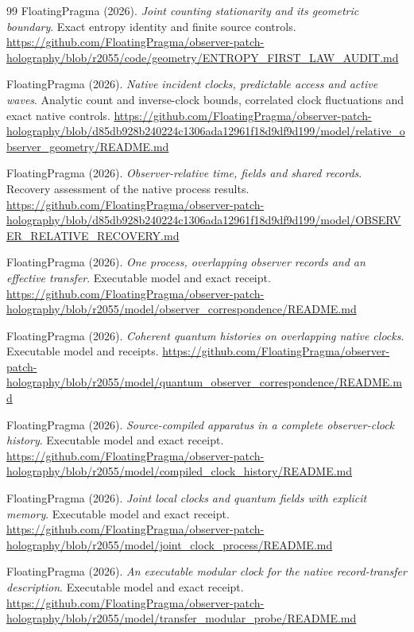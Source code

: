 \documentclass[11pt]{article}
\theoremstyle{definition}
\theoremstyle{remark}
\theoremstyle{plain}
\begin{document}
{\begin{thebibliography}{99}
FloatingPragma (2026). \emph{Joint counting stationarity and its geometric
boundary}. Exact entropy identity and finite source controls.
\url{https://github.com/FloatingPragma/observer-patch-holography/blob/r2055/code/geometry/ENTROPY_FIRST_LAW_AUDIT.md}

FloatingPragma (2026). \emph{Native incident clocks, predictable access and
active waves}. Analytic count and inverse-clock bounds, correlated
clock fluctuations and exact native controls.
\url{https://github.com/FloatingPragma/observer-patch-holography/blob/d85db928b240224c1306ada12961f18d9df9d199/model/relative_observer_geometry/README.md}

FloatingPragma (2026). \emph{Observer-relative time, fields and shared
records}. Recovery assessment of the native process results.
\url{https://github.com/FloatingPragma/observer-patch-holography/blob/d85db928b240224c1306ada12961f18d9df9d199/model/OBSERVER_RELATIVE_RECOVERY.md}

FloatingPragma (2026). \emph{One process, overlapping observer records and
an effective transfer}. Executable model and exact receipt.
\url{https://github.com/FloatingPragma/observer-patch-holography/blob/r2055/model/observer_correspondence/README.md}

FloatingPragma (2026). \emph{Coherent quantum histories on overlapping
native clocks}. Executable model and receipts.
\url{https://github.com/FloatingPragma/observer-patch-holography/blob/r2055/model/quantum_observer_correspondence/README.md}

FloatingPragma (2026). \emph{Source-compiled apparatus in a complete
observer-clock history}. Executable model and exact receipt.
\url{https://github.com/FloatingPragma/observer-patch-holography/blob/r2055/model/compiled_clock_history/README.md}

FloatingPragma (2026). \emph{Joint local clocks and quantum fields with
explicit memory}. Executable model and exact receipt.
\url{https://github.com/FloatingPragma/observer-patch-holography/blob/r2055/model/joint_clock_process/README.md}

FloatingPragma (2026). \emph{An executable modular clock for the native
record-transfer description}. Executable model and exact receipt.
\url{https://github.com/FloatingPragma/observer-patch-holography/blob/r2055/model/transfer_modular_probe/README.md}


\end{thebibliography}}
\end{document}
